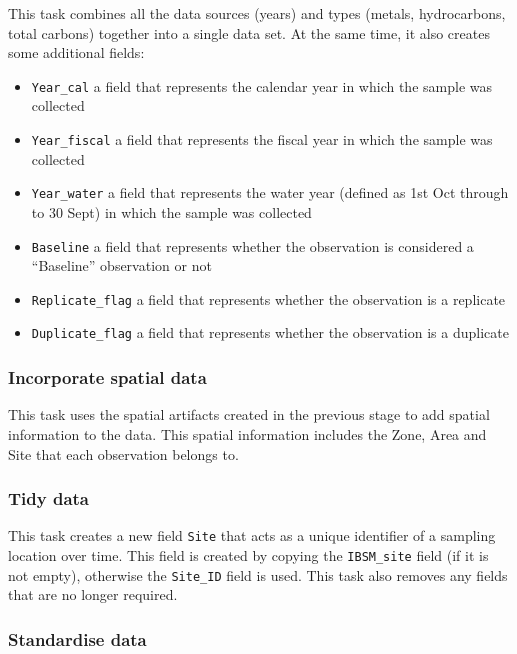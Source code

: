 \documentclass[
  8pt,
  a4paper]{article}
\providecommand{\tightlist}{%
  \setlength{\itemsep}{0pt}\setlength{\parskip}{0pt}}
\begin{document}
This task combines all the data sources (years) and types (metals,
hydrocarbons, total carbons) together into a single data set. At the
same time, it also creates some additional fields:

\begin{itemize}
\tightlist
\item
  \texttt{Year\_cal} a field that represents the calendar year in which
  the sample was collected
\item
  \texttt{Year\_fiscal} a field that represents the fiscal year in which
  the sample was collected
\item
  \texttt{Year\_water} a field that represents the water year (defined
  as 1st Oct through to 30 Sept) in which the sample was collected
\item
  \texttt{Baseline} a field that represents whether the observation is
  considered a ``Baseline'' observation or not
\item
  \texttt{Replicate\_flag} a field that represents whether the
  observation is a replicate
\item
  \texttt{Duplicate\_flag} a field that represents whether the
  observation is a duplicate
\end{itemize}

\subsubsection{Incorporate spatial data}\label{incorporate-spatial-data}

This task uses the spatial artifacts created in the previous stage to
add spatial information to the data. This spatial information includes
the Zone, Area and Site that each observation belongs to.

\subsubsection{Tidy data}\label{tidy-data}

This task creates a new field \texttt{Site} that acts as a unique
identifier of a sampling location over time. This field is created by
copying the \texttt{IBSM\_site} field (if it is not empty), otherwise
the \texttt{Site\_ID} field is used. This task also removes any fields
that are no longer required.

\subsubsection{Standardise data}\label{standardise-data}
\end{document}
